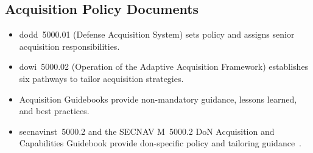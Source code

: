 \documentclass[../main.tex]{subfiles}
\begin{document}
\subsection{Acquisition Policy Documents}
\begin{itemize}
  \item \ac{dodd}~5000.01 (Defense Acquisition System) sets policy and assigns senior acquisition responsibilities.
  \item \ac{dowi}~5000.02 (Operation of the Adaptive Acquisition Framework) establishes six pathways to tailor acquisition strategies.
  \item Acquisition Guidebooks provide non-mandatory guidance, lessons learned, and best practices.
  \item \ac{secnavinst}~5000.2 and the SECNAV M~5000.2 DoN Acquisition and Capabilities Guidebook provide \ac{don}-specific policy and tailoring guidance~\autocite{edo-3-3-1-acq-policy-players-2025}.
\end{itemize}
\end{document}
